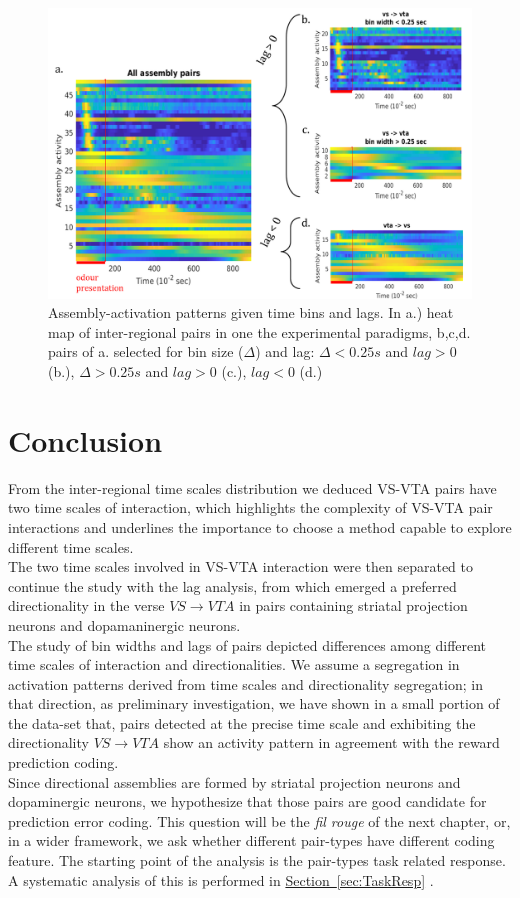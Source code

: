 \begin{figure}
    \centering
    \includegraphics[scale=0.45]{figures/AsActPerBinLag1.png}
    \caption{Assembly-activation patterns given time bins and lags. In a.) heat map of inter-regional pairs in one the experimental paradigms, b,c,d. pairs of a. selected for bin size ($\Delta$) and lag: $\Delta < 0.25 s$ and $lag > 0$ (b.), $\Delta > 0.25 s$ and $lag > 0$ (c.), $lag < 0$ (d.)}
    \label{fig:AsActBinLag}
\end{figure}
\section{Conclusion}
From the inter-regional time scales distribution we deduced VS-VTA pairs have two time scales of interaction, which highlights the complexity of VS-VTA pair interactions and underlines the importance to choose a method capable to explore different time scales.\\The two time scales involved in VS-VTA interaction were then separated to continue the study with the lag analysis, from which emerged a preferred directionality in the verse $VS\rightarrow VTA$ in pairs containing striatal projection neurons and dopamaninergic neurons.\\The study of bin widths and lags of pairs depicted differences among different time scales of interaction and directionalities. We assume a segregation in activation patterns derived from time scales and directionality segregation; in that direction, as preliminary investigation, we have shown in a small portion of the data-set that, pairs detected at the precise time scale and exhibiting the directionality $VS\rightarrow VTA$ show an activity pattern in agreement with the reward prediction coding.\\Since directional assemblies are formed by striatal projection neurons and dopaminergic neurons, we hypothesize that those pairs are good candidate for prediction error coding. This question will be the \textit{fil rouge} of the next chapter, or, in a wider framework, we ask whether different pair-types have different coding feature. The starting point of the analysis is the pair-types task related response. A systematic analysis of this is performed in \hyperref[sec:TaskResp]{Section~\ref*{sec:TaskResp}} .

